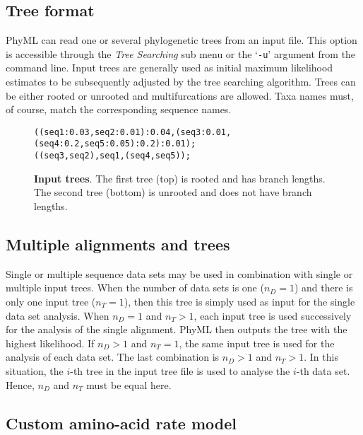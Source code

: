 \documentclass[a4paper,12pt]{article}
\newcommand{\x}[1]{\texttt{#1}}
\begin{document}
\subsection{Tree format}

PhyML can  read one or  several phylogenetic trees  from an input  file.  This option  is accessible
through the  {\em Tree Searching} sub  menu or the `\x{-u}'  argument from the  command line.  Input
trees are generally used as initial maximum  likelihood estimates to be subsequently adjusted by the
tree searching algorithm.   Trees can be either rooted or unrooted  and multifurcations are allowed.
Taxa names must, of course, match the corresponding sequence names.

\begin{figure}[h]
\begin{small}
\begin{minipage}{\textwidth}
\begin{verbatim}
((seq1:0.03,seq2:0.01):0.04,(seq3:0.01,(seq4:0.2,seq5:0.05):0.2):0.01);
((seq3,seq2),seq1,(seq4,seq5));
\end{verbatim}
\end{minipage}
\end{small}
\caption{{\bf Input trees}. The first tree (top) is rooted and has branch lengths. The second tree
  (bottom) is unrooted and does not have branch lengths.}
\label{fig:trees}
\end{figure}


\subsection{Multiple alignments and trees}

Single or  multiple sequence  data sets may  be used  in combination with  single or  multiple input
trees. When the number of data sets is one ($n_D = 1$) and there is only one input tree ($n_T = 1$),
then this tree is simply  used as input for the single data set analysis. When  $n_D = 1$ and $n_T >
1$,  each input tree  is used  successively for  the analysis  of the  single alignment.  PhyML then
outputs the tree  with the highest likelihood.  If $n_D > 1$ and  $n_T = 1$, the same  input tree is
used for the analysis  of each data set.  The last  combination is $n_D > 1$ and $n_T  > 1$. In this
situation, the  $i$-th tree in the input  tree file is used  to analyse the $i$-th  data set. Hence,
$n_D$ and $n_T$ must be equal here.


\subsection{Custom amino-acid rate model}\label{sec:customaa}
\end{document}
